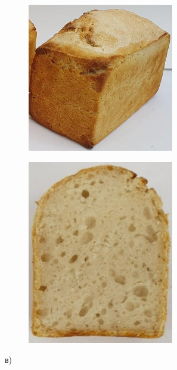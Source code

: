 \begin{figure}[H]
	\centering
	\begin{subfigure}{0.48\textwidth}
		\centering
		\includegraphics[width=0.7\textwidth,height=0.7\textwidth]{media/pish/image65}
	\end{subfigure}
	\begin{subfigure}{0.48\textwidth}
		\centering
		\includegraphics[width=0.7\textwidth,height=0.7\textwidth]{media/pish/image66}
	\end{subfigure}
	\caption*{в)}
\end{figure}

